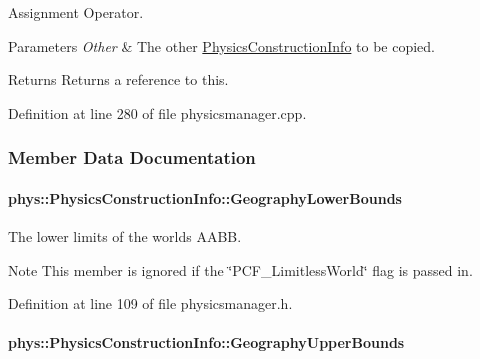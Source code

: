 Assignment Operator. 


\begin{DoxyParams}{Parameters}
{\em Other} & The other \hyperlink{classphys_1_1PhysicsConstructionInfo}{PhysicsConstructionInfo} to be copied. \\
\hline
\end{DoxyParams}
\begin{DoxyReturn}{Returns}
Returns a reference to this. 
\end{DoxyReturn}


Definition at line 280 of file physicsmanager.cpp.



\subsubsection{Member Data Documentation}
\hypertarget{classphys_1_1PhysicsConstructionInfo_ab45b8f19cf4d10351a8ea5ecce56363a}{
\paragraph[{GeographyLowerBounds}]{ {\bf phys::PhysicsConstructionInfo::GeographyLowerBounds}}\hfill}
\label{classphys_1_1PhysicsConstructionInfo_ab45b8f19cf4d10351a8ea5ecce56363a}


The lower limits of the worlds AABB. 

\begin{DoxyNote}{Note}
This member is ignored if the \char`\"{}PCF\_\-LimitlessWorld\char`\"{} flag is passed in. 
\end{DoxyNote}


Definition at line 109 of file physicsmanager.h.

\hypertarget{classphys_1_1PhysicsConstructionInfo_aca489cc9e35eeb816ad3d0d069c29688}{
\paragraph[{GeographyUpperBounds}]{ {\bf phys::PhysicsConstructionInfo::GeographyUpperBounds}}\hfill}
\label{classphys_1_1PhysicsConstructionInfo_aca489cc9e35eeb816ad3d0d069c29688}


